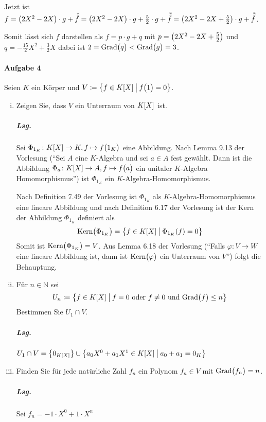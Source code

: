 \documentclass{scrreprt}
\newcommand\Grad{\text{Grad}}
\newcommand\Kern{\text{Kern}}
\begin{document}
Jetzt ist $f = \qty(2X^2 - 2X) \cdot g + {\tilde{\tilde f}}
= \qty(2X^2 - 2X) \cdot g + \frac{5}{2} \cdot g + \tilde {\tilde{\tilde f}}
= \qty(2X^2 - 2X + \frac{5}{2}) \cdot g + \tilde {\tilde{\tilde f}}$.

Somit lässt sich $f$ darstellen als $f = p \cdot g + q$ mit
$p = \qty(2X^2 - 2X + \frac{5}{2})$ und $q = -\frac{15}{2}X^2 + \frac{3}{2}X$
dabei ist $2 = \Grad\qty\big(q) < \Grad\qty\big(g) = 3$.

\paragraph{Aufgabe 4} Seien $K$ ein Körper und
$V \coloneqq \qty{f \in K\qty[X] \:{\big |}\: f\qty\big(1) = 0}$.
\begin{enumerate}[(i)]
\item Zeigen Sie, dass $V$ ein Unterraum von $K\qty[X]$ ist.

  \subparagraph{Lsg.} Sei $\Phi_{1_K} \colon K\qty[X] \to K,
  f \mapsto f\qty\big(1_K)$ eine Abbildung.
  Nach Lemma 9.13 der Vorlesung (``Sei $A$ eine $K$-Algebra und sei $a \in A$
  fest gewählt.
  Dann ist die Abbildung $\Phi_a \colon K\qty[X] \to A, f \mapsto f\qty\big(a)$
  ein unitaler $K$-Algebra Homomorphismus'') ist $\Phi_{1_K}$ ein
  $K$-Algebra-Homomorphismus.

  Nach Definition 7.49 der Vorlesung ist $\Phi_{1_K}$ als
  $K$-Algebra-Homomorphismus eine lineare Abbildung und nach
  Definition 6.17 der Vorlesung ist der Kern der Abbildung $\Phi_{1_K}$
  definiert als
  \[
    \Kern\qty\big(\Phi_{1_K}) = \qty{
      f \in K\qty[X] \:{\big |}\: \Phi_{1_K}(f) = 0
    }
  \]
  Somit ist $\Kern\qty\big(\Phi_{1_K}) = V$.
  Aus Lemma 6.18 der Vorlesung (``Falls $\varphi \colon V \to W$ eine
  lineare Abbildung ist, dann ist $\Kern\qty\big(\varphi)$ ein Unterraum
  von $V$'') folgt die Behauptung.

\item Für $n \in \mathbb{N}$ sei
  \[
    U_n \coloneqq \qty{
      f \in K\qty[X] \:{\big |}\: f = 0 \text{ oder } f \ne 0
      \text { und } \Grad\qty\big(f) \leq n
    }
  \]
  Bestimmen Sie $U_1 \cap V$.

  \subparagraph{Lsg.} $U_1 \cap V = \qty{0_{K\qty[X]}} \cup
  \qty{a_0X^0 + a_1X^1 \in K\qty[X] \:{\big |}\: a_0 + a_1 = 0_K}$

\item Finden Sie für jede natürliche Zahl $f_n$ ein Polynom
  $f_n \in V$ mit $\Grad\qty\big(f_n) = n$.

  \subparagraph{Lsg.} Sei $f_n = -1 \cdot X^0 + 1 \cdot X^n$


\end{enumerate}
\end{document}
